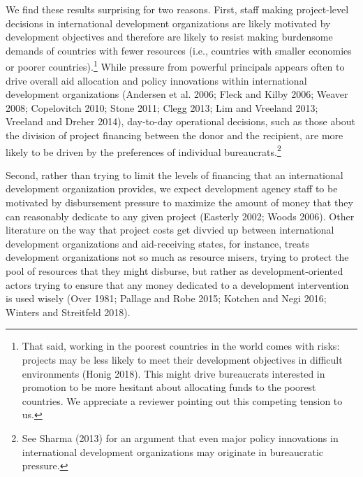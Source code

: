 \documentclass{article}
\begin{document}
We find these results surprising for two reasons.  First, staff making project-level decisions in international development organizations are likely motivated by development objectives and therefore are likely to resist making burdensome demands of countries with fewer resources (i.e., countries with smaller economies or poorer countries).\footnote{That said, working in the poorest countries in the world comes with risks: projects may be less likely to meet their development objectives in difficult environments (Honig 2018).  This might drive bureaucrats interested in promotion to be more hesitant about allocating funds to the poorest countries.  We appreciate a reviewer pointing out this competing tension to us.}   While pressure from powerful principals appears often to drive overall aid allocation and policy innovations within international development organizations (Andersen et al. 2006; Fleck and Kilby 2006; Weaver 2008; Copelovitch 2010; Stone 2011; Clegg 2013; Lim and Vreeland 2013; Vreeland and Dreher 2014), day-to-day operational decisions, such as those about the division of project financing between the donor and the recipient, are more likely to be driven by the preferences of individual bureaucrats.\footnote{See Sharma (2013) for an argument that even major policy innovations in international development organizations may originate in bureaucratic pressure.}   

Second, rather than trying to limit the levels of financing that an international development organization provides, we expect development agency staff to be motivated by disbursement pressure to maximize the amount of money that they can reasonably dedicate to any given project (Easterly 2002; Woods 2006).  Other literature on the way that project costs get divvied up between international development organizations and aid-receiving states, for instance, treats development organizations not so much as resource misers, trying to protect the pool of resources that they might disburse, but rather as development-oriented actors trying to ensure that any money dedicated to a development intervention is used wisely (Over 1981; Pallage and Robe 2015; Kotchen and Negi 2016; Winters and Streitfeld 2018).
\end{document}
